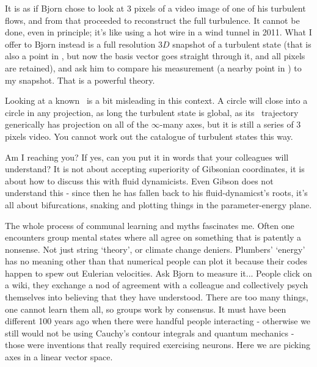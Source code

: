 \begin{description}
\medskip

It is as if Bjorn chose to look at 3 pixels of a
video image of one of his turbulent flows, and from that proceeded to
reconstruct the full turbulence. It cannot be done, even in principle;
it's like using a hot wire in a wind tunnel in 2011. What I offer to
Bjorn instead is a full resolution $3D$ snapshot of a turbulent state
(that is also a point in \statesp, but now the basis vector goes straight
through  it, and all pixels are retained), and ask him to compare his
measurement (a nearby point in \statesp) to my snapshot. That is a powerful
theory.

\medskip

Looking at a known \rpo\ is a bit misleading in this context. A circle
will close into a circle in any projection, as long the turbulent state
is global, as its \statesp\ trajectory generically has projection on all
of the $\infty$-many axes, but it is still a series of 3 pixels video.
You cannot work out the catalogue of turbulent states this way.

\medskip

Am I reaching you? If yes, can you put it in words that your colleagues
will understand? It is not about accepting superiority of Gibsonian
coordinates, it is about how to discuss this with fluid dynamicists. Even
Gibson does not understand this - since then he has fallen back to his
fluid-dynamicst's roots, it's all about bifurcations, snaking and plotting
things in the parameter-energy plane.


\medskip

The whole process of communal learning and myths fascinates me. Often one
encounters group mental states where all agree on something that is
patently a nonsense. Not just string `theory', or climate change deniers.
Plumbers' `energy' has no meaning other than that numerical people can
plot it because their codes happen to spew out Eulerian velocities. Ask
Bjorn to measure it... People click on a wiki, they exchange a nod of
agreement with a colleague and collectively psych themselves into
believing that they have understood. There are too many things, one
cannot learn them all, so groups work by consensus. It must have been
different 100 years ago when there were handful people interacting -
otherwise we still would not be using Cauchy's contour integrals and
quantum mechanics - those were inventions that really required exercising
neurons. Here we are picking axes in a linear vector space.

\medskip


\end{description}
